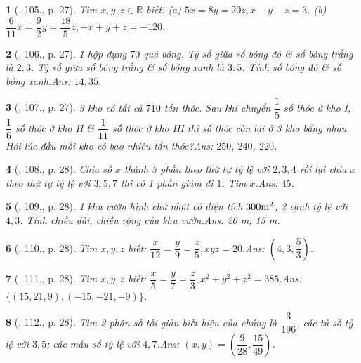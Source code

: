 \documentclass{article}
\newtheorem{baitoan}{}
\begin{document}
\begin{baitoan}[\cite{Tuyen_Toan_7}, 105., p. 27]
	Tìm $x,y,z\in\mathbb{R}$ biết: (a) $5x = 8y = 20z,x - y - z = 3$. (b) $\dfrac{6}{11}x = \dfrac{9}{2}y = \dfrac{18}{5}z,-x + y + z = -120$.
\end{baitoan}

\begin{baitoan}[\cite{Tuyen_Toan_7}, 106., p. 27]
	1 hộp đựng $70$ quả bóng. Tỷ số giữa số bóng đỏ \& số bóng trắng là $2:3$. Tỷ số giữa số bóng trắng \& số bóng xanh là $3:5$. Tính số bóng đỏ \& số bóng xanh.\hfill{\sf Ans:} $14,35$.
\end{baitoan}

\begin{baitoan}[\cite{Tuyen_Toan_7}, 107., p. 27]
	3 kho có tất cả $710$ tấn thóc. Sau khi chuyển $\dfrac{1}{5}$ số thóc ở kho I, $\dfrac{1}{6}$ số thóc ở kho II \& $\dfrac{1}{11}$ số thóc ở kho III thì số thóc còn lại ở 3 kho bằng nhau. Hỏi lúc đầu mỗi kho có bao nhiêu tấn thóc?\hfill{\sf Ans:} $250$, $240$, $220$.
\end{baitoan}

\begin{baitoan}[\cite{Tuyen_Toan_7}, 108., p. 28]
	Chia số $x$ thành 3 phần theo thứ tự tỷ lệ với $2,3,4$ rồi lại chia $x$ theo thứ tự tỷ lệ với $3,5,7$ thì có 1 phần giảm đi $1$. Tìm $x$.\hfill{\sf Ans:} $45$.
\end{baitoan}

\begin{baitoan}[\cite{Tuyen_Toan_7}, 109., p. 28]
	1 khu vườn hình chữ nhật có diện tích $\rm300m^2$, 2 cạnh tỷ lệ với $4,3$. Tính chiều dài, chiều rộng của khu vườn.\hfill{\sf Ans:} {\rm20 m, 15 m}.
\end{baitoan}

\begin{baitoan}[\cite{Tuyen_Toan_7}, 110., p. 28]
	Tìm $x,y,z$ biết: $\dfrac{x}{12} = \dfrac{y}{9} = \dfrac{z}{5},xyz = 20$.\hfill{\sf Ans:} $\left(4,3,\dfrac{5}{3}\right)$.
\end{baitoan}

\begin{baitoan}[\cite{Tuyen_Toan_7}, 111., p. 28]
	Tìm $x,y,z$ biết: $\dfrac{x}{5} = \dfrac{y}{7} = \dfrac{z}{3},x^2 + y^2 + z^2 = 385$.\hfill{\sf Ans:} $\{(15,21,9),(-15,-21,-9)\}$.
\end{baitoan}

\begin{baitoan}[\cite{Tuyen_Toan_7}, 112., p. 28]
	Tìm 2 phân số tối giản biết hiệu của chúng là $\dfrac{3}{196}$, các tử số tỷ lệ với $3,5$; các mẫu số tỷ lệ với $4,7$.\hfill{\sf Ans:} $(x,y) = \left(\dfrac{9}{28},\dfrac{15}{49}\right)$.
\end{baitoan}
\end{document}
